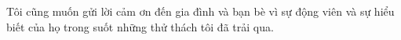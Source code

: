 Tôi cũng muốn gửi lời cảm ơn đến gia đình và bạn bè vì sự động viên và sự hiểu biết của họ trong suốt những thử thách tôi đã trải qua.


\cleardoublepage